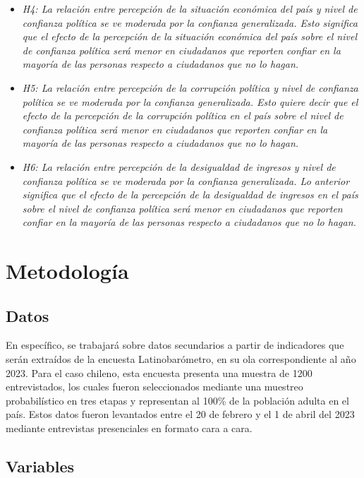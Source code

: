 \documentclass[12pt,twoside]{templates/facsothesis}
\begin{document}
\begin{itemize}
\item
  \emph{H4: La relación entre percepción de la situación económica del país y nivel de confianza política se ve moderada por la confianza generalizada. Esto significa que el efecto de la percepción de la situación económica del país sobre el nivel de confianza política será menor en ciudadanos que reporten confiar en la mayoría de las personas respecto a ciudadanos que no lo hagan.}
\item
  \emph{H5: La relación entre percepción de la corrupción política y nivel de confianza política se ve moderada por la confianza generalizada. Esto quiere decir que el efecto de la percepción de la corrupción política en el país sobre el nivel de confianza política será menor en ciudadanos que reporten confiar en la mayoría de las personas respecto a ciudadanos que no lo hagan.}
\item
  \emph{H6: La relación entre percepción de la desigualdad de ingresos y nivel de confianza política se ve moderada por la confianza generalizada. Lo anterior significa que el efecto de la percepción de la desigualdad de ingresos en el país sobre el nivel de confianza política será menor en ciudadanos que reporten confiar en la mayoría de las personas respecto a ciudadanos que no lo hagan.}
\end{itemize}

\chapter{Metodología}\label{metodologuxeda}

\section{Datos}\label{datos}

En específico, se trabajará sobre datos secundarios a partir de indicadores que serán extraídos de la encuesta Latinobarómetro, en su ola correspondiente al año 2023. Para el caso chileno, esta encuesta presenta una muestra de 1200 entrevistados, los cuales fueron seleccionados mediante una muestreo probabilístico en tres etapas y representan al 100\% de la población adulta en el país. Estos datos fueron levantados entre el 20 de febrero y el 1 de abril del 2023 mediante entrevistas presenciales en formato cara a cara.

\section{Variables}\label{variables}
\end{document}
